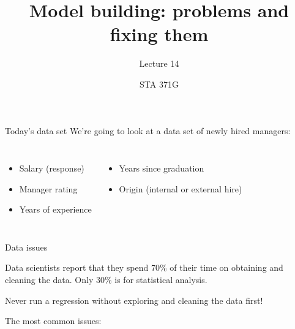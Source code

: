 \documentclass{beamer}\usepackage[]{graphicx}\usepackage[]{color}
\title{Model building: problems and fixing them}
\subtitle{Lecture 14}
\author{STA 371G}
\begin{document}
  
  

  \frame{\maketitle}



  \begin{darkframes}
    \begin{frame}{Today's data set}
      We're going to look at a data set of newly hired managers:
      \begin{columns}[onlytextwidth]
          \begin{itemize}
            \item Salary (response)
            \item Manager rating
            \item Years of experience
          \end{itemize}
          \begin{itemize}
            \item Years since graduation
            \item Origin (internal or external hire)
          \end{itemize}
      \end{columns}
    \end{frame}

    \begin{frame}[fragile]{Data issues}
      \begin{center}
        Data scientists report that they spend \alert{70\% of their time on obtaining and cleaning the data}. Only 30\% is for statistical analysis.\bigskip \pause

        Never run a regression without exploring and cleaning the data first!
      \end{center}
    \end{frame}

    \begin{frame}
    \end{frame}

    \begin{frame}
      The most common issues:
      \tableofcontents
    \end{frame}


\end{darkframes}
\end{document}
